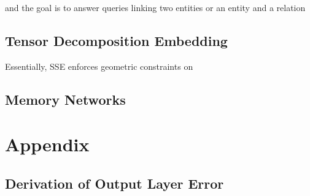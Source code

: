 \documentclass[pageno]{jpaper}
\begin{document}
and
the goal is to answer queries linking two entities or an entity and a relation

\subsection{Tensor Decomposition Embedding}
\label{Tensor Decomposition Embedding}
Essentially, SSE enforces geometric constraints on

\subsection{Memory Networks}
\label{Memory Networks}




\section{Appendix}
\label{Appendix}

\subsection{Derivation of Output Layer Error}
\label{Derivation of Output Layer Error}

\end{document}
